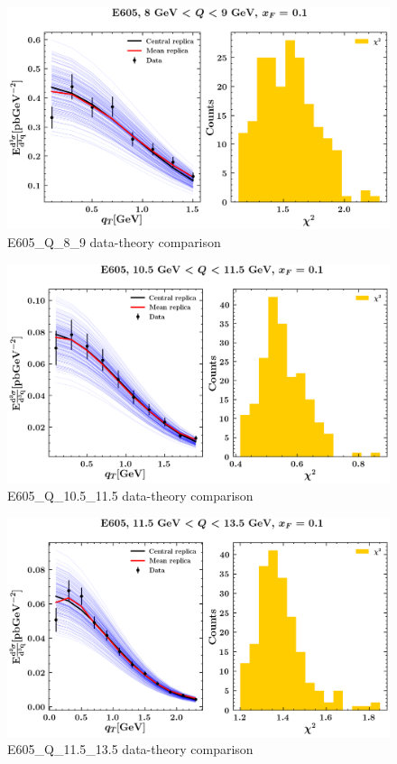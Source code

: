 \documentclass[
]{article}
\begin{document}
\begin{figure}
\centering
\includegraphics{pngplots/E605_Q_8_9.png}
\caption{E605\_Q\_8\_9 data-theory comparison}
\end{figure}

\begin{figure}
\centering
\includegraphics{pngplots/E605_Q_10.5_11.5.png}
\caption{E605\_Q\_10.5\_11.5 data-theory comparison}
\end{figure}

\begin{figure}
\centering
\includegraphics{pngplots/E605_Q_11.5_13.5.png}
\caption{E605\_Q\_11.5\_13.5 data-theory comparison}
\end{figure}
\end{document}
